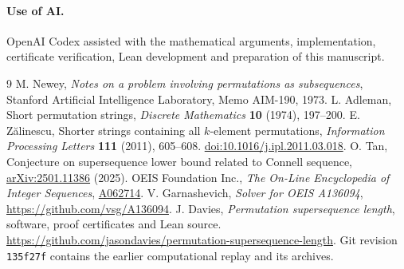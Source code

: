 \documentclass[11pt]{article}
\newcommand{\repo}{\url{https://github.com/jasondavies/permutation-supersequence-length}}
\begin{document}
\paragraph{Use of AI.}
OpenAI Codex assisted with the mathematical arguments, implementation, certificate verification, Lean development and preparation of this manuscript.

\begin{thebibliography}{9}
 M. Newey, \emph{Notes on a problem involving permutations as subsequences}, Stanford Artificial Intelligence Laboratory, Memo AIM-190, 1973.
 L. Adleman, Short permutation strings, \emph{Discrete Mathematics} \textbf{10} (1974), 197--200.
 E. Z\u{a}linescu, Shorter strings containing all $k$-element permutations, \emph{Information Processing Letters} \textbf{111} (2011), 605--608. \href{https://doi.org/10.1016/j.ipl.2011.03.018}{doi:10.1016/j.ipl.2011.03.018}.
 O. Tan, Conjecture on supersequence lower bound related to Connell sequence, \href{https://arxiv.org/abs/2501.11386}{arXiv:2501.11386} (2025).
 OEIS Foundation Inc., \emph{The On-Line Encyclopedia of Integer Sequences}, \href{https://oeis.org/A062714}{A062714}.
 V. Garnashevich, \emph{Solver for OEIS A136094}, \url{https://github.com/vsg/A136094}.
 J. Davies, \emph{Permutation supersequence length}, software, proof certificates and Lean source. \repo. Git revision \texttt{135f27f} contains the earlier computational replay and its archives.
\end{thebibliography}
\end{document}
